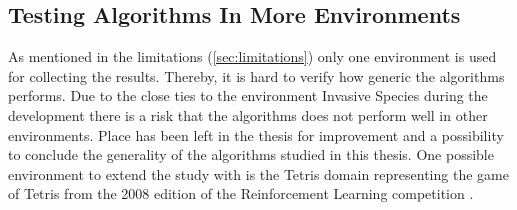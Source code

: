 \subsection{Testing Algorithms In More Environments }
As mentioned in the limitations (\ref{sec:limitations}) only one environment is used for collecting the results. Thereby, it is hard to verify how generic the algorithms performs. Due to the close ties to the environment Invasive Species during the development there is a risk that the algorithms does not perform well in other environments. Place has been left in the thesis for improvement and a possibility to conclude the generality of the algorithms studied in this thesis. One possible environment to extend the study with is the Tetris domain representing the game of Tetris from the 2008 edition of the Reinforcement Learning competition \parencite{whiteson2010reinforcement}.  

